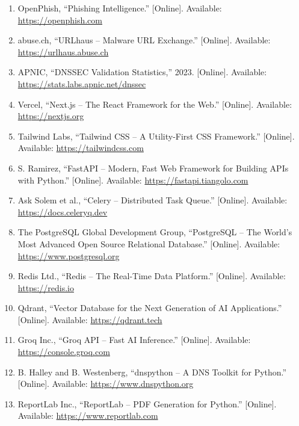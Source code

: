 \documentclass[12pt, a4paper, oneside]{report}
\begin{document}
\begin{enumerate}
  \item OpenPhish, ``Phishing Intelligence.'' [Online]. Available: \url{https://openphish.com}

  \item abuse.ch, ``URLhaus -- Malware URL Exchange.'' [Online]. Available: \url{https://urlhaus.abuse.ch}

  \item APNIC, ``DNSSEC Validation Statistics,'' 2023. [Online]. Available: \url{https://stats.labs.apnic.net/dnssec}

  \item Vercel, ``Next.js -- The React Framework for the Web.'' [Online]. Available: \url{https://nextjs.org}

  \item Tailwind Labs, ``Tailwind CSS -- A Utility-First CSS Framework.'' [Online]. Available: \url{https://tailwindcss.com}

  \item S. Ramirez, ``FastAPI -- Modern, Fast Web Framework for Building APIs with Python.'' [Online]. Available: \url{https://fastapi.tiangolo.com}

  \item Ask Solem et al., ``Celery -- Distributed Task Queue.'' [Online]. Available: \url{https://docs.celeryq.dev}

  \item The PostgreSQL Global Development Group, ``PostgreSQL -- The World's Most Advanced Open Source Relational Database.'' [Online]. Available: \url{https://www.postgresql.org}

  \item Redis Ltd., ``Redis -- The Real-Time Data Platform.'' [Online]. Available: \url{https://redis.io}

  \item Qdrant, ``Vector Database for the Next Generation of AI Applications.'' [Online]. Available: \url{https://qdrant.tech}

  \item Groq Inc., ``Groq API -- Fast AI Inference.'' [Online]. Available: \url{https://console.groq.com}

  \item B. Halley and B. Westenberg, ``dnspython -- A DNS Toolkit for Python.'' [Online]. Available: \url{https://www.dnspython.org}

  \item ReportLab Inc., ``ReportLab -- PDF Generation for Python.'' [Online]. Available: \url{https://www.reportlab.com}


\end{enumerate}
\end{document}
